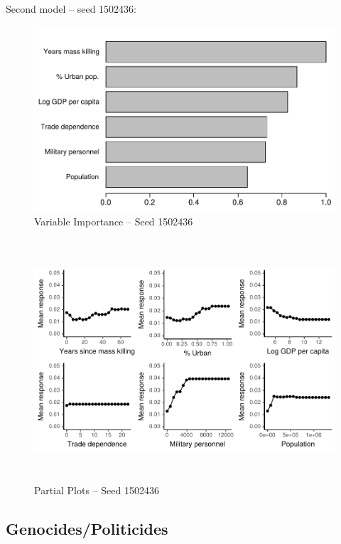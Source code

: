 \newpage

Second model -- seed 1502436: 

\begin{figure}[H]
    \centering
    \includegraphics{images/drf-mk3.pdf}
    \caption{Variable Importance -- Seed 1502436}
    \label{fig:my_label}
\end{figure}

\begin{figure}[H]
    \centering
    \includegraphics[width=\textwidth, height=9cm]{images/drfdpp3a.pdf}
    \caption{Partial Plots -- Seed 1502436}
    \label{fig:my_label}
\end{figure}

\newpage

\subsection{Genocides/Politicides}
\label{sec:mk-other-variable}

